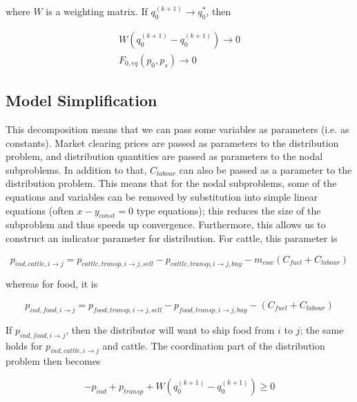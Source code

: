 \documentclass[letter,12pt]{article}
\begin{document}
\noindent where $W$ is a weighting matrix.  If $q_0^{\left(k+1\right)} \rightarrow q_0^*$, then 

\begin{align}
W \left(q_0^{\left(k+1\right)} - q_0^{\left(k+1\right)}\right) \rightarrow 0 \\
F_{0,eq} \left(p_0, p_s\right) \rightarrow 0
\end{align} 

\subsection{Model Simplification}

This decomposition means that we can pass some variables as parameters (i.e. as constants).  Market clearing prices are passed as parameters to the distribution problem, and distribution quantities are passed as parameters to the nodal subproblems.  In addition to that, $C_{labour}$ can also be passed as a parameter to the distribution problem.  This means that for the nodal subproblems, some of the equations and variables can be removed by substitution into simple linear equations (often $x-y_{const}=0$ type equations); this reduces the size of the subproblem and thus speeds up convergence.  Furthermore, this allows us to construct an indicator parameter for distribution.  For cattle, this parameter is

\begin{equation}
p_{ind,cattle,i \rightarrow j} = p_{cattle,transp,i \rightarrow j,sell} - p_{cattle,transp,i \rightarrow j,buy} - m_{cow} \left(C_{fuel} + C_{labour}\right)
\end{equation}

\noindent whereas for food, it is

\begin{equation}
p_{ind,food,i \rightarrow j} = p_{food,transp,i \rightarrow j,sell} - p_{food,transp,i \rightarrow j,buy} - \left(C_{fuel} + C_{labour}\right)
\end{equation}

If $p_{ind,food,i \rightarrow j}$, then the distributor will want to ship food from $i$ to $j$; the same holds for $p_{ind,cattle,i \rightarrow j}$ and cattle.  The coordination part of the distribution problem then becomes

\begin{equation}
- p_{ind} + p_{transp} + W \left(q_0^{\left(k+1\right)} - q_0^{\left(k+1\right)}\right) \geq 0
\end{equation}
\end{document}
